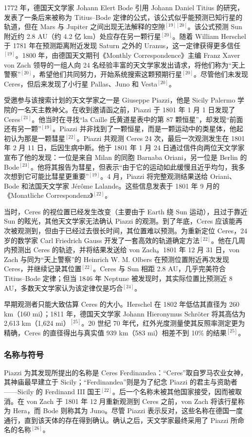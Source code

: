 1772 年，德国天文学家 Johann Elert Bode 引用 Johann Daniel Titius 的研究，发表了一条后来被称为 Titius–Bode 定律的公式，该公式似乎能预测已知行星的轨道，但在 Mars 与 Jupiter 之间出现无法解释的空隙\(^{[19][20]}\)。该公式预测 Sun 附近约 2.8 AU（约 4.2 亿 km）处应存在另一颗行星\(^{[20]}\)。随着 William Herschel 于 1781 年在预测距离附近发现 Saturn 之外的 Uranus，这一定律获得更多信任\(^{[19]}\)。1800 年，由德国天文期刊《Monthly Correspondence》主编 Franz Xaver von Zach 领导的一组人向 24 名经验丰富的天文学家发出请求，将他们称为“天上警察”\(^{[20]}\)，希望他们共同努力，开始系统搜索这颗预期行星\(^{[20]}\)。尽管他们未发现 Ceres，但后来发现了小行星 Pallas、Juno 和 Vesta\(^{[20]}\)。

受邀参与该搜索计划的天文学家之一是 Giuseppe Piazzi，他是 Sicily Palermo 学院的一名天主教神父。在收到邀请函之前，Piazzi 于 1801 年 1 月 1 日发现了 Ceres\(^{[21]}\)。他当时在寻找“la Caille 氏黄道星表中的第 87 颗恒星”，却发现“前面还有另一颗”\(^{[19]}\)。Piazzi 并非找到了一颗恒星，而是一颗运动中的类星体，他起初认为那是一颗彗星\(^{[22]}\)。Piazzi 共观测 Ceres 24 次，最后一次观测发生在 1801 年 2 月 11 日，后因生病中断。他于 1801 年 1 月 24 日通过信件向两位天文学家宣布了他的发现：一位是来自 Milan 的同胞 Barnaba Oriani，另一位是 Berlin 的 Bode\(^{[23]}\)。他将其报告为彗星，但表示“由于它的运动如此缓慢且近乎均匀，我多次想到它可能比彗星更重要”\(^{[19]}\)。4 月，Piazzi 将完整观测结果送给 Oriani、Bode 和法国天文学家 Jérôme Lalande。这些信息发表于 1801 年 9 月的《Monatliche Correspondenz》\(^{[22]}\)。

当时，Ceres 的视位置已经发生改变（主要由于 Earth 绕 Sun 运动），且过于靠近 Sun 的眩光，其他天文学家无法确认 Piazzi 的观测。到了年底，Ceres 应该能再次被观测到，但由于已经过去很长时间，其位置难以预测。为重新定位 Ceres，24 岁的数学家 Carl Friedrich Gauss 开发了一套高效的轨道确定方法\(^{[22]}\)。他在几周内预测出 Ceres 的轨迹，并将结果发送给 von Zach。1801 年 12 月 31 日，von Zach 与同为“天上警察”的 Heinrich W. M. Olbers 在预测位置附近再次发现 Ceres，并继续记录其位置\(^{[22]}\)。Ceres 与 Sun 相距 2.8 AU，几乎完美符合 Titius–Bode 定律；但当 1846 年 Neptune 被发现时，其实际位置比预测近 8 AU，多数天文学家认为该定律仅是巧合\(^{[24]}\)。

早期观测者只能大致估算 Ceres 的大小。Herschel 在 1802 年低估其直径为 260 km（160 mi）；1811 年，德国天文学家 Johann Hieronymus Schröter 将其高估为 2,613 km（1,624 mi）\(^{[25]}\)。20 世纪 70 年代，红外光度测量使其反照率测定更为精确，Ceres 的直径得出与真实值 939 km（583 mi）相差不到 10\% 的结果\(^{[25]}\)。
\subsubsection{名称与符号}  
Piazzi 为其发现所提出的名称是 Ceres Ferdinandea：“Ceres”取自罗马农业女神，其神庙最早建立于 Sicily；“Ferdinandea”则是为了纪念 Piazzi 的君主与资助者——Sicily 的 Ferdinand III 国王\(^{[22]}\)。后一个名称未被其他国家接受，因而被取消。在 von Zach 于 1801 年 12 月重新观测到 Ceres 之前，von Zach 将该行星称为 Hera，而 Bode 则称其为 Juno。尽管 Piazzi 表示反对，这些名称在德国一度通行，直到该天体的存在得到确认。确认之后，天文学家最终采用了 Piazzi 所命名的名称\(^{[26]}\)。

